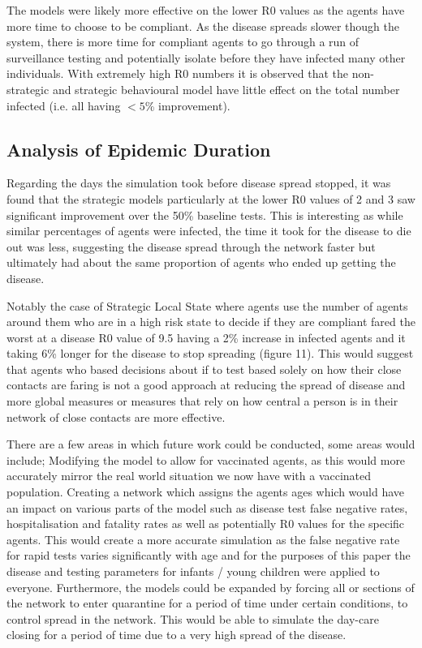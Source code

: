 \documentclass{article}
\begin{document}
The models were likely more effective on the lower R0 values as the agents have more time to choose to be compliant. As the disease spreads slower though the system, there is more time for compliant agents to go through a run of surveillance testing and potentially isolate before they have infected many other individuals. With extremely high R0 numbers it is observed that the non-strategic and strategic behavioural model have little effect on the total number infected (i.e. all having $< 5$\% improvement). 


\subsection{Analysis of Epidemic Duration}

Regarding the days the simulation took before disease spread stopped, it was found that the strategic models particularly at the lower R0 values of 2 and 3 saw significant improvement over the 50\% baseline tests. This is interesting as while similar percentages of agents were infected, the time it took for the disease to die out was less, suggesting the disease spread through the network faster but ultimately had about the same proportion of agents who ended up getting the disease.\newline 

Notably the case of Strategic Local State where agents use the number of agents around them who are in a high risk state to decide if they are compliant fared the worst at a disease R0 value of 9.5 having a 2\% increase in infected agents and it taking 6\% longer for the disease to stop spreading (figure 11). This would suggest that agents who based decisions about if to test based solely on how their close contacts are faring is not a good approach at reducing the spread of disease and more global measures or measures that rely on how central a person is in their network of close contacts are more effective. \newline 

There are a few areas in which future work could be conducted, some areas would include; Modifying the model to allow for vaccinated agents, as this would more accurately mirror the real world situation we now have with a vaccinated population. Creating a network which assigns the agents ages which would have an impact on various parts of the model such as disease test false negative rates, hospitalisation and fatality rates as well as potentially R0 values for the specific agents. This would create a more accurate simulation as the false negative rate for rapid tests varies significantly with age and for the purposes of this paper the disease and testing parameters for infants / young children were applied to everyone. Furthermore, the models could be expanded by forcing all or sections of the network to enter quarantine for a period of time under certain conditions, to control spread in the network. This would be able to simulate the day-care closing for a period of time due to a very high spread of the disease.
\end{document}
